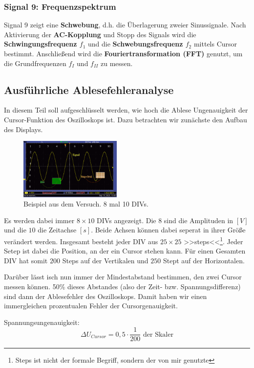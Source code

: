 \subsubsection{Signal 9: Frequenzspektrum}
Signal 9 zeigt eine \textbf{Schwebung}, d.h. die Überlagerung zweier Sinussignale. Nach Aktivierung der \textbf{AC-Kopplung} und Stopp des Signals wird die \textbf{Schwingungsfrequenz $f_1$} und die \textbf{Schwebungsfrequenz $f_2$} mittels Cursor bestimmt. Anschließend wird die \textbf{Fouriertransformation (FFT)} genutzt, um die Grundfrequenzen $f_I$ und $f_{II}$ zu messen.

\subsection*{Ausführliche Ablesefehleranalyse}
In diesem Teil soll aufgeschlüsselt werden, wie hoch die Ablese Ungenauigkeit der Cursor-Funktion des Oszilloskops ist. 
Dazu betrachten wir zunächste den Aufbau des Displays. 

\begin{figure} [h!]
    \centering
        \includegraphics[width=0.45\textwidth]{img/25/SinusVis.pdf}
    \caption{Beispiel aus dem Versuch. 8 mal 10 DIVs.}
\end{figure}

Es werden dabei immer $8 \times 10$ DIVs angezeigt. Die $8$ sind die Amplituden in $[V]$ und die $10$ die Zeitachse $[s]$. Beide Achsen können dabei seperat in ihrer Größe verändert werden.
Insgesamt besteht jeder DIV aus $25 \times 25$ >>steps<<\footnote{Steps ist nicht der formale Begriff, sondern der von mir genutzte}. Jeder Setep ist dabei die Position, an der ein Cursor stehen kann. 
Für einen Gesamten DIV hat somit $200$ Steps auf der Vertikalen und $250$ Stept auf der Horizontalen. 

Darüber lässt isch nun immer der Mindestabstand bestimmen, den zwei Cursor messen können. 50\% dieses Abstandes (also der Zeit- bzw. Spannungsdifferenz) sind dann der Ablesefehler des Oszilloskops.
Damit haben wir einen immergleichen prozentualen Fehler der Cursorgenauigkeit. 

Spannungsungenauigkeit:
\begin{equation}
    \Delta U_{Cursor} = 0,5 \cdot \frac{1}{200} \text{ der Skaler}
\end{equation}

